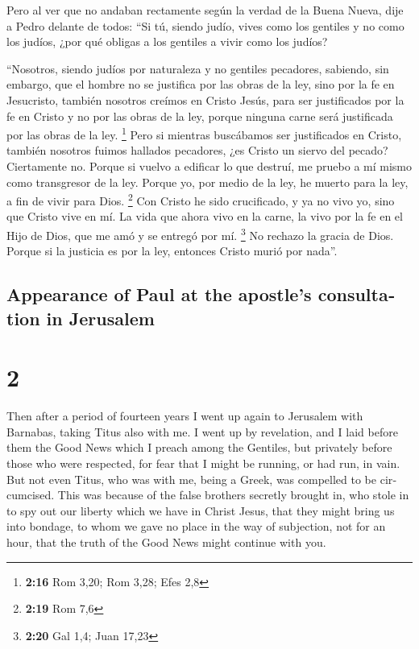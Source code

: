\begin{paracol}{2}
 Pero al ver que no andaban rectamente según la verdad de
la Buena Nueva, dije a Pedro delante de todos: ``Si tú, siendo judío,
vives como los gentiles y no como los judíos, ¿por qué obligas a los
gentiles a vivir como los judíos?

 ``Nosotros, siendo judíos por naturaleza y no gentiles
pecadores,  sabiendo, sin embargo, que el hombre no se
justifica por las obras de la ley, sino por la fe en Jesucristo, también
nosotros creímos en Cristo Jesús, para ser justificados por la fe en
Cristo y no por las obras de la ley, porque ninguna carne será
justificada por las obras de la ley. \footnote{\textbf{2:16} Rom 3,20;
  Rom 3,28; Efes 2,8}  Pero si mientras buscábamos ser
justificados en Cristo, también nosotros fuimos hallados pecadores, ¿es
Cristo un siervo del pecado? Ciertamente no.  Porque si
vuelvo a edificar lo que destruí, me pruebo a mí mismo como transgresor
de la ley.  Porque yo, por medio de la ley, he muerto
para la ley, a fin de vivir para Dios. \footnote{\textbf{2:19} Rom 7,6}
 Con Cristo he sido crucificado, y ya no vivo yo, sino
que Cristo vive en mí. La vida que ahora vivo en la carne, la vivo por
la fe en el Hijo de Dios, que me amó y se entregó por mí. \footnote{\textbf{2:20}
  Gal 1,4; Juan 17,23}  No rechazo la gracia de Dios.
Porque si la justicia es por la ley, entonces Cristo murió por nada''.

\switchcolumn
\begin{otherlanguage}{english}

\hypertarget{appearance-of-paul-at-the-apostles-consultation-in-jerusalem}{%
\subsection{Appearance of Paul at the apostle's consultation in
Jerusalem}\label{appearance-of-paul-at-the-apostles-consultation-in-jerusalem}}

\hypertarget{section-3}{%
\section{2}\label{section-3}}

 Then after a period of fourteen years I went up again to
Jerusalem with Barnabas, taking Titus also with me.  I
went up by revelation, and I laid before them the Good News which I
preach among the Gentiles, but privately before those who were
respected, for fear that I might be running, or had run, in vain.
 But not even Titus, who was with me, being a Greek, was
compelled to be circumcised.  This was because of the
false brothers secretly brought in, who stole in to spy out our liberty
which we have in Christ Jesus, that they might bring us into bondage,
 to whom we gave no place in the way of subjection, not
for an hour, that the truth of the Good News might continue with you.


\end{otherlanguage}
\end{paracol}
